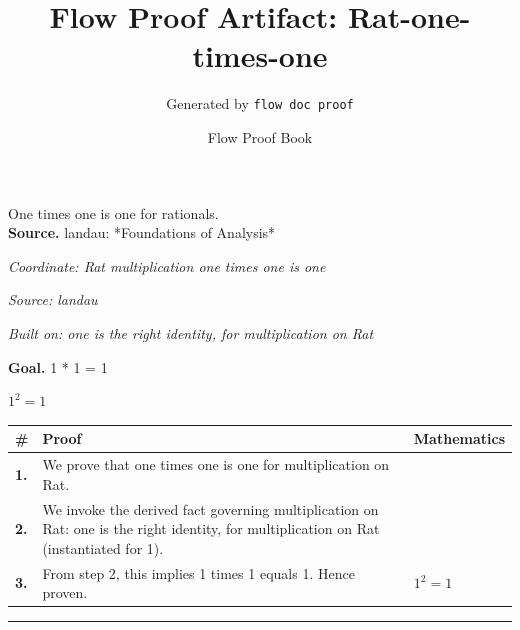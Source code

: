 \documentclass[11pt]{article}
\title{Flow Proof Artifact: Rat-one-times-one}
\author{Generated by \texttt{flow doc proof}}
\date{Flow Proof Book}
\theoremstyle{definition}
\begin{document}
\maketitle
One times one is one for rationals.\\[0.5em]
\textbf{Source.} landau: *Foundations of Analysis*\\[0.5em]
\bigskip
{}\par
\smallskip\noindent\textit{Coordinate: Rat \cdot multiplication \cdot one times one is one}\par
\smallskip\noindent\textit{Source: landau}\par
\smallskip\noindent\textit{Built on: one is the right identity, for multiplication on Rat}\par
\medskip
\noindent\textbf{Goal.} 1 * 1 = 1\par
\noindent$\displaystyle 1^{2} = 1$\par
\medskip
\noindent
\begin{tabular}{@{} >{\raggedright\arraybackslash}p{} >{\raggedright\arraybackslash}p{} >{\raggedleft\arraybackslash}p{} @{}}
\textbf{\#} & \textbf{Proof} & \textbf{Mathematics} \\
\midrule
\textbf{1.} & We prove that one times one is one for multiplication on Rat. & \\[0.45em]
\textbf{2.} & We invoke the derived fact governing multiplication on Rat: one is the right identity, for multiplication on Rat (instantiated for 1). & \\[0.45em]
\textbf{3.} & From step 2, this implies 1 times 1 equals 1. Hence proven. & $\displaystyle 1^{2} = 1$ \\[0.45em]
\bottomrule
\end{tabular}
\label{thm:Rat-multiplication-one_times_one_is_one}
\par\medskip\hrule
\end{document}
